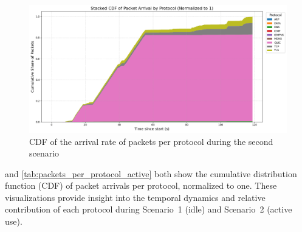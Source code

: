 \documentclass[sigconf,nonacm]{acmart}
\begin{document}
\begin{figure}[htbp]
    \centering
    \includegraphics[width=\columnwidth]{images/part2/active use/cdf.png}
    \caption{CDF of the arrival rate of packets per protocol during the second scenario}
    \label{fig:cdf_total_protocols_active}
\end{figure}
 and \cref{tab:packets_per_protocol_active} both show the cumulative distribution function (CDF) of packet arrivals per protocol, normalized to one. These visualizations provide insight into the temporal dynamics and relative contribution of each protocol during Scenario~1 (idle) and Scenario~2 (active use).
\end{document}
